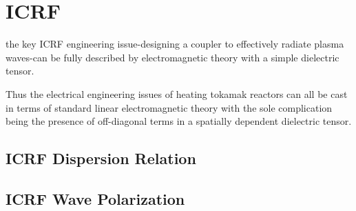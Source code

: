 % 
% 

\section{ICRF}\label{sec:icrh}


the key ICRF engineering issue-designing a coupler to effectively radiate plasma waves-can be fully described by electromagnetic theory with a simple dielectric tensor\cite{perkins1984}.

Thus the electrical engineering issues of heating tokamak
reactors can all be cast in terms of standard linear electromagnetic
theory with the sole complication being the presence
of off-diagonal terms in a spatially dependent dielectric tensor\cite{perkins1984}.


\subsection{ICRF Dispersion Relation}

\subsection{ICRF Wave Polarization}

